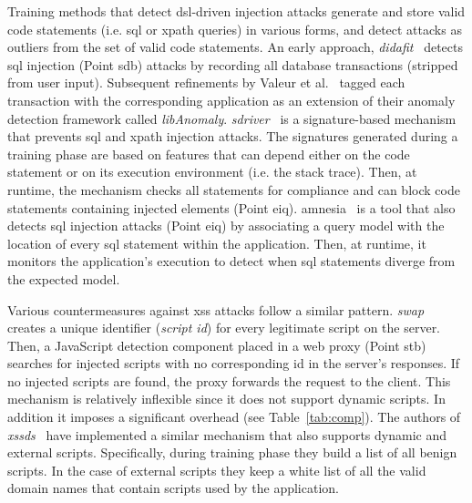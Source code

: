 \documentclass[conference]{IEEEtran}
\begin{document}
Training methods that detect {\sc dsl}-driven injection attacks
generate and store valid code statements (i.e. {\sc sql} or {\sc
  xp}ath queries) in various forms, and detect attacks as outliers
from the set of valid code statements. An early approach, {\it {\sc
    didafit}}~\cite{LLW02} detects {\sc sql} injection (Point
sdb) attacks by recording all database transactions
(stripped from user input). Subsequent
refinements by Valeur et al.~\cite{VMV05} tagged each transaction with
the corresponding application as an extension of their anomaly
detection framework called {\it libAnomaly}. {\it {\sc
    sd}river}~\cite{MS09,MKS09,MKLS11} is a signature-based mechanism
that prevents {\sc sql} and {\sc xp}ath injection attacks. The
signatures generated during a training phase are based on features
that can depend either on the code statement or on its execution
environment (i.e. the stack trace). Then, at runtime, the mechanism
checks all statements for compliance and can block code statements
containing injected elements (Point {\sc e}i{\sc q}). {\sc
  amnesia}~\cite{HO05,HO06,HO05b} is a tool that also detects {\sc
  sql} injection attacks (Point {\sc e}i{\sc q}) by associating a query model
with the location of every {\sc sql} statement within the application.
Then, at runtime, it monitors the application's execution to detect
when {\sc sql} statements diverge from the expected model.

Various countermeasures against {\sc xss} attacks follow a similar
pattern. {\it {\sc swap}}~\cite{WPLKK09} creates a unique identifier
({\it script {\sc id}}) for every legitimate script on the server.
Then, a JavaScript detection component placed in a web proxy (Point
{\sc s}t{\sc b}) searches for injected scripts with no corresponding {\sc id}
in the server's responses. If no injected scripts are found, the proxy
forwards the request to the client. This mechanism is relatively
inflexible since it does not support dynamic scripts. In addition it
imposes a significant overhead (see Table~\ref{tab:comp}). The authors
of {\it {\sc xssds}}~\cite{JEP08} have implemented a similar mechanism
that also supports dynamic and external scripts. Specifically, during
training phase they build a list of all benign scripts. In the case of
external scripts they keep a white list of all the valid domain names
that contain scripts used by the application.
\end{document}

